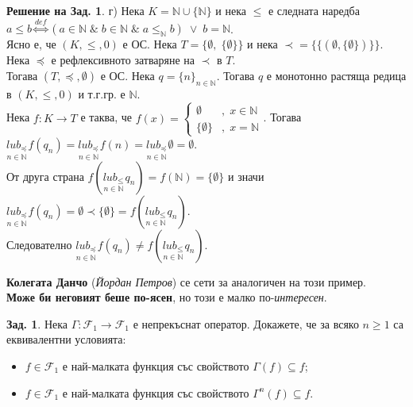 \documentclass[a4paper,9pt]{extarticle}
\theoremstyle{definition}
\newtheorem{problem}{Зад.}
\newtheorem{solution}{Решение на Зад.}
\newcommand{\Nat}{\mathbb{N}}
\newcommand{\F}{\mathcal{F}}
\begin{document}
\begin{solution}
г) Нека \(K = \Nat \cup \{\Nat\}\) и нека \(\leqslant\) е следната наредба $a \leqslant b \overset{def}{\iff} (a \in \Nat \;\&\; b \in \Nat \;\&\; a \leq_\Nat b) \;\lor\; b = \Nat$. \\
Ясно е, че $(K, \leqslant, 0)$ е ОС. 
Нека \(T = \{\emptyset, \; \{\emptyset\}\}\) и нека \(\prec = \{\{(\emptyset, \{\emptyset\})\}\}\).
Нека \(\preceq\) е рефлексивното затваряне на $\prec$ в $T$. \\
Тогава $(T, \preceq, \emptyset)$ е ОС. Нека \(q = \{n\}_{n \in \Nat}\). Тогава $q$ е монотонно растяща редица в $(K, \leqslant, 0)$ и т.г.гр. е $\Nat$. \\
Нека \(f : K \to T\) е таква, че \(f(x) = \begin{cases}
    \emptyset &, \; x \in \Nat \\
    \{\emptyset\} &, \; x = \Nat
\end{cases}\). Тогава $\underset{n \in \Nat}{lub_\preceq}\hspace{1pt} f(q_n) = \underset{n \in \Nat}{lub_\preceq}\hspace{1pt} f(n) = \underset{n \in \Nat}{lub_\preceq}\hspace{1pt} \emptyset = \emptyset$. \\
От друга страна $f\left(\underset{n \in \Nat}{lub_\leqslant}\hspace{1pt} q_n\right) = f(\Nat) = \{\emptyset\}$ и значи $\underset{n \in \Nat}{lub_\preceq}\hspace{1pt} f(q_n) = \emptyset \prec \{\emptyset\} = f\left(\underset{n \in \Nat}{lub_\leqslant}\hspace{1pt} q_n\right)$. \\
Следователно $\underset{n \in \Nat}{lub_\preceq}\hspace{1pt} f(q_n) \neq f\left(\underset{n \in \Nat}{lub_\leqslant}\hspace{1pt} q_n\right)$.

\vskip9pt

\textbf{Колегата Данчо} (\textit{Йордан Петров}) се сети за аналогичен на този пример. \\
\textbf{Може би неговият беше по-ясен}, но този е малко по-\textit{интересен}.  

\end{solution}

\newpage

\begin{problem} Нека $\Gamma\!: \F_1 \rightarrow \F_1$  е непрекъснат оператор. Докажете, че за всяко $n\geq 1$ са еквивалентни условията:

\vskip2pt

\begin{itemize}
    \item $f\in \F_1$ е най-малката функция със свойството $\Gamma(f)\subseteq f$;
    \item $f\in \F_1$ е най-малката функция със свойството $\Gamma^n(f)\subseteq f$.
\end{itemize}

\end{problem}
\end{document}
